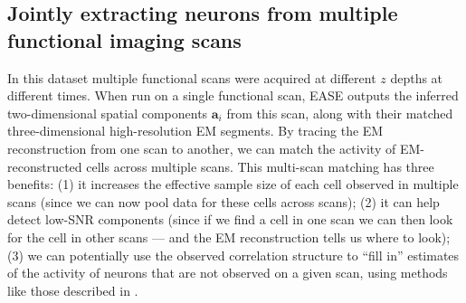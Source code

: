 \documentclass[10pt,letterpaper]{article}
\begin{document}
{\subsection{Jointly extracting neurons from multiple functional imaging scans}
\label{sec:methods-joint-extraction}
In this dataset multiple functional scans were acquired at different $z$ depths at different times.  When run on a single functional scan, EASE outputs the inferred two-dimensional spatial components $\bm{a}_i$ from this scan, along with their matched three-dimensional high-resolution EM segments.  By tracing the EM reconstruction from one scan to another, we can match the activity of EM-reconstructed cells across multiple scans.  This multi-scan matching has three benefits: (1) it increases the effective sample size of each cell observed in multiple scans (since we can now pool data for these cells across scans); (2) it can help detect low-SNR components (since if we find a cell in one scan we can then look for the cell in other scans --- and the EM reconstruction tells us where to look); (3) we can potentially use the observed correlation structure to ``fill in'' estimates of the activity of neurons that are not observed on a given scan, using methods like those described in \citep{Soudry2015}.




}
\end{document}

